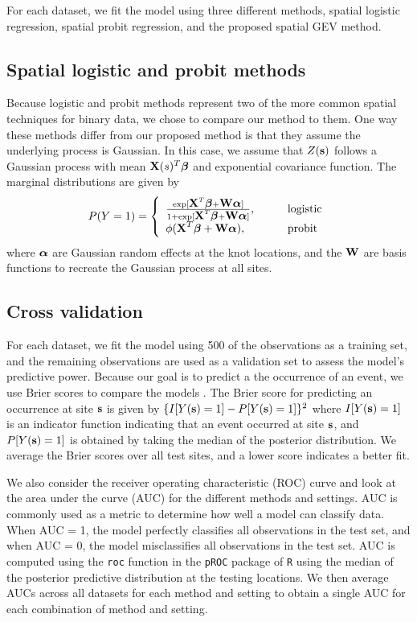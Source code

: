 \documentclass[11pt]{article}
\begin{document}
For each dataset, we fit the model using three different methods, spatial logistic regression, spatial probit regression, and the proposed spatial GEV method.

\subsection{Spatial logistic and probit methods}
Because logistic and probit methods represent two of the more common spatial techniques for binary data, we chose to compare our method to them.
One way these methods differ from our proposed method is that they assume the underlying process is Gaussian.
In this case, we assume that $Z(\mbox{\bf s})$ follows a Gaussian process with mean $\mbox{\bf X}(s)^T \mbox{\boldmath $\beta$}$ and exponential covariance function.
The marginal distributions are given by
\begin{align}
  P(Y = 1) = \left\{ \begin{array}{ll}
    \frac{\exp[\mbox{\bf X}^T \mbox{\boldmath $\beta$} + \mbox{\bf W} \mbox{\boldmath $\alpha$}]}{1 + \exp[\mbox{\bf X}^T \mbox{\boldmath $\beta$} + \mbox{\bf W} \mbox{\boldmath $\alpha$}]}, \qquad &\text{logistic}\\
    \phi(\mbox{\bf X}^T \mbox{\boldmath $\beta$} + \mbox{\bf W} \mbox{\boldmath $\alpha$}), \qquad &\text{probit}
  \end{array}\right.
\end{align}
where $\mbox{\boldmath $\alpha$}$ are Gaussian random effects at the knot locations, and the $\mbox{\bf W}$ are basis functions to recreate the Gaussian process at all sites.

\subsection{Cross validation}\label{rbs:modelselect}
For each dataset, we fit the model using 500 of the observations as a training set, and the remaining observations are used as a validation set to assess the model's predictive power.
Because our goal is to predict a the occurrence of an event, we use Brier scores to compare the models \citep{Gneiting2007}.
The Brier score for predicting an occurrence at site $\mbox{\bf s}$ is given by $\{I[Y(\mbox{\bf s})=1] - P[Y(\mbox{\bf s})=1]\}^2$ where $I[Y(\mbox{\bf s}) = 1]$ is an indicator function indicating that an event occurred at site $\mbox{\bf s}$, and $P[Y(\mbox{\bf s}) = 1]$ is obtained by taking the median of the posterior distribution.
We average the Brier scores over all test sites, and a lower score indicates a better fit.

We also consider the receiver operating characteristic (ROC) curve and look at the area under the curve (AUC) for the different methods and settings.
AUC is commonly used as a metric to determine how well a model can classify data.
When AUC = 1, the model perfectly classifies all observations in the test set, and when AUC = 0, the model misclassifies all observations in the test set.
AUC is computed using the \texttt{roc} function in the \texttt{pROC} package of \texttt{R} using the median of the posterior predictive distribution at the testing locations.
We then average AUCs across all datasets for each method and setting to obtain a single AUC for each combination of method and setting.
\end{document}
